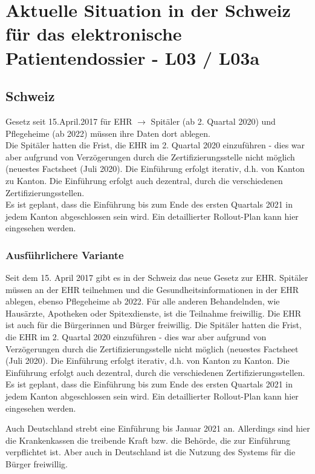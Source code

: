 \documentclass{report}
\theoremstyle{definition}
\theoremstyle{example}
\begin{document}
\chapter{Aktuelle Situation in der Schweiz für das elektronische Patientendossier - L03 / L03a}

\section{Schweiz}

Gesetz seit 15.April.2017 für EHR $\rightarrow$ Spitäler (ab 2. Quartal 2020) und Pflegeheime (ab 2022) müssen ihre Daten dort ablegen.\\
Die Spitäler hatten die Frist, die EHR im 2. Quartal 2020 einzuführen - dies war aber aufgrund von Verzögerungen durch die Zertifizierungsstelle nicht möglich (neuestes Factsheet (Juli 2020). Die Einführung erfolgt iterativ, d.h. von Kanton zu Kanton. Die Einführung erfolgt auch dezentral, durch die verschiedenen Zertifizierungsstellen.\\
Es ist geplant, dass die Einführung bis zum Ende des ersten Quartals 2021 in jedem Kanton abgeschlossen sein wird. Ein detaillierter Rollout-Plan kann hier eingesehen werden.\\

\subsection{Ausführlichere Variante}

Seit dem 15. April 2017 gibt es in der Schweiz das neue Gesetz zur EHR. Spitäler müssen an der EHR teilnehmen und die Gesundheitsinformationen in der EHR ablegen, ebenso Pflegeheime ab 2022. Für alle anderen Behandelnden, wie Hausärzte, Apotheken oder Spitexdienste, ist die Teilnahme freiwillig. 
Die EHR ist auch für die Bürgerinnen und Bürger freiwillig. Die Spitäler hatten die Frist, die EHR im 2. Quartal 2020 einzuführen - dies war aber aufgrund von Verzögerungen durch die Zertifizierungsstelle nicht möglich (neuestes Factsheet (Juli 2020). Die Einführung erfolgt iterativ, 
d.h. von Kanton zu Kanton. Die Einführung erfolgt auch dezentral, durch die verschiedenen Zertifizierungsstellen. Es ist geplant, dass die Einführung bis zum Ende des ersten Quartals 2021 in jedem Kanton abgeschlossen sein wird. Ein detaillierter Rollout-Plan kann hier eingesehen werden.

Auch Deutschland strebt eine Einführung bis Januar 2021 an. Allerdings sind hier die Krankenkassen die treibende Kraft bzw. die Behörde, die zur Einführung verpflichtet ist. Aber auch in Deutschland ist die Nutzung des Systems für die Bürger freiwillig. 
\end{document}
